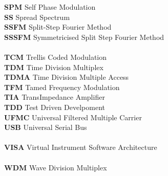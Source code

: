 \begin{multicols}{2}
\begin{tabbing}
\textbf{SPM}		\>	Self Phase Modulation							\\
\textbf{SS}			\>	Spread Spectrum									\\
\textbf{SSFM}		\>	Split-Step Fourier Method						\\
\textbf{SSSFM}		\>	Symmetricised Split Step Fourier Method			\\
\\
\textbf{TCM}		\>	Trellis Coded Modulation						\\
\textbf{TDM}		\>	Time Division Multiplex							\\
\textbf{TDMA}		\>	Time Division Multiple Access					\\
\textbf{TFM}		\>	Tamed Frequency Modulation						\\
\textbf{TIA}		\>	TransImpedance Amplifier						\\
\textbf{TDD}        \>  Test Driven Develpoment
\\
\textbf{UFMC}		\>	Universal Filtered Multiple Carrier				\\
\textbf{USB}		\>	Universal Serial Bus							\\
\\
\textbf{VISA}		\>	Virtual Instrument Software Architecture		\\
\\
\textbf{WDM}		\>	Wave Division Multiplex							\\
\end{tabbing}
%
\end{multicols}
\normalsize

